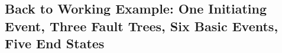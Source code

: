 \fi

\subsection{Back to Working Example: One Initiating Event, Three Fault Trees, Six Basic Events, Five End States}
\begin{frame}
  \begin{columns}
  \end{columns}
\end{frame}
